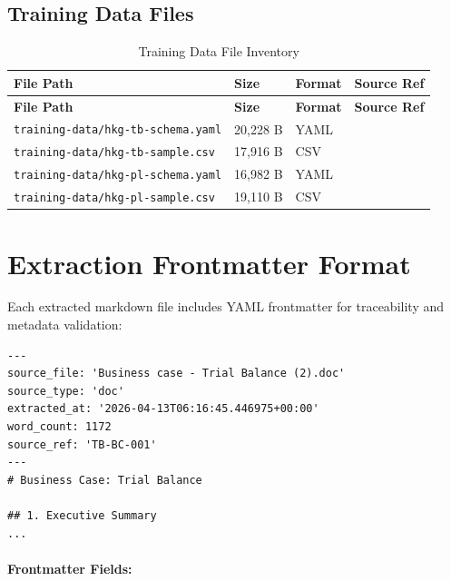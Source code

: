 \subsection{Training Data Files}

\begin{longtable}{@{}L{6cm}C{2cm}C{2cm}L{3.5cm}@{}}
\caption{Training Data File Inventory}
\label{tab:training-data-inventory} \\
\toprule
\textbf{File Path} & \textbf{Size} & \textbf{Format} & \textbf{Source Ref} \\
\midrule
\endfirsthead
\toprule
\textbf{File Path} & \textbf{Size} & \textbf{Format} & \textbf{Source Ref} \\
\midrule
\endhead
\texttt{training-data/hkg-tb-schema.yaml} & 20,228 B & YAML &  \\
\texttt{training-data/hkg-tb-sample.csv} & 17,916 B & CSV &  \\
\texttt{training-data/hkg-pl-schema.yaml} & 16,982 B & YAML &  \\
\texttt{training-data/hkg-pl-sample.csv} & 19,110 B & CSV &  \\
\bottomrule
\end{longtable}

\section{Extraction Frontmatter Format}
\label{sec:extraction-frontmatter}

Each extracted markdown file includes YAML frontmatter for traceability
and metadata validation:

\begin{lstlisting}[language=yamlx,caption=Extraction Frontmatter Example]
---
source_file: 'Business case - Trial Balance (2).doc'
source_type: 'doc'
extracted_at: '2026-04-13T06:16:45.446975+00:00'
word_count: 1172
source_ref: 'TB-BC-001'
---
# Business Case: Trial Balance

## 1. Executive Summary
...
\end{lstlisting}

\paragraph{Frontmatter Fields:}


